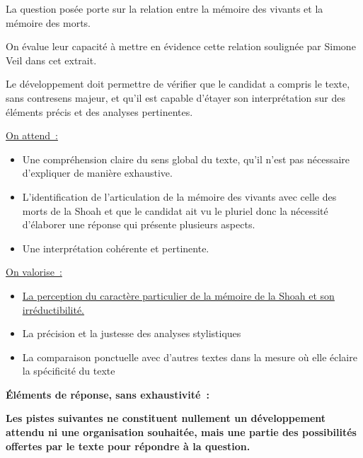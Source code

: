 {La question posée porte sur la relation entre la mémoire des vivants et la mémoire des morts.

On évalue leur capacité à mettre en évidence cette relation soulignée par Simone Veil dans cet
extrait.

Le développement doit permettre de vérifier que le candidat a compris le texte, sans contresens
majeur, et qu'il est capable d'étayer son interprétation sur des éléments précis et des analyses
pertinentes.

\underline{On attend~:}
\begin{itemize}
\item Une compréhension claire du sens global du texte, qu'il n'est pas nécessaire d'expliquer
de manière exhaustive.
\item L'identification de l'articulation de la mémoire des vivants avec celle des morts de la Shoah
et que le candidat ait vu le pluriel donc la nécessité d'élaborer une réponse qui présente
plusieurs aspects.
\item Une interprétation cohérente et pertinente.
\end{itemize}

\underline{On valorise~:}
\begin{itemize}
\item \underline{La perception du caractère particulier de la mémoire de la Shoah et son irréductibilité.}
\item La précision et la justesse des analyses stylistiques
\item La comparaison ponctuelle avec d'autres textes dans la mesure où elle éclaire la
spécificité du texte
\end{itemize}

\bigskip

\textbf{Éléments de réponse, sans exhaustivité~:}

\textbf{Les pistes suivantes ne constituent nullement un développement attendu ni une
organisation souhaitée, mais une partie des possibilités offertes par le texte pour répondre
à la question.}

}
